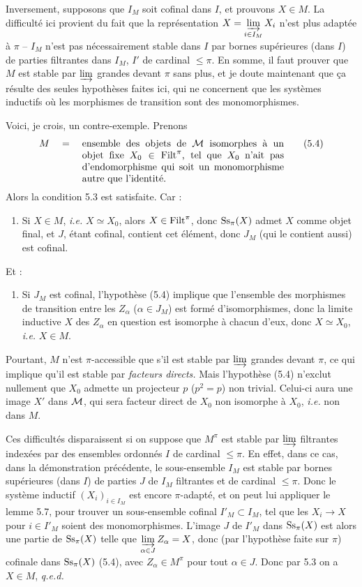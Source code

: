 Inversement, supposons que $I_M$ soit cofinal dans $I$, et prouvons $X \in M$. La difficulté ici provient du fait que la représentation $X = \varinjlim\limits_{i\in I_M} X_i$ n'est plus adaptée à $\pi$ -- $I_M$ n'est pas nécessairement stable dans $I$ par bornes supérieures (dans $I$) de parties filtrantes dans $I_M$, $I'$ de cardinal $\leq \pi$. En somme, il faut
prouver que $M$ est stable par $\varinjlim$ grandes devant $\pi$ sans plus, et je doute maintenant que ça résulte des seules hypothèses faites ici, qui ne concernent que les systèmes inductifs où les morphismes de transition sont des monomorphismes.

Voici, je crois, un contre-exemple. Prenons
\[
M \quad = \quad \parbox[t]{0.6\textwidth}{ensemble des objets de $\cM$ isomorphes à un objet fixe $X_0 \in \Filt^{\pi}$, tel que $X_0$ n'ait pas d'endomorphisme qui soit un monomorphisme autre que l'identité.}
\tag*{(5.4)}
\]
Alors la condition 5.3 est satisfaite. Car :
\begin{enumerate}[nosep]
\item[\textit{a})] Si $X \in M$, \textit{i.e.} $X \simeq X_0$, alors $X \in \mathrm{Filt}^{\pi}$, donc $\mathrm{Ss}_{\pi}(X)$ admet $X$ comme objet final, et $J$, étant cofinal, contient cet élément, donc $J_M$ (qui le contient aussi) est cofinal.
\end{enumerate}
Et :
\begin{enumerate}[nosep]
\item[\textit{b})] Si $J_M$ est cofinal, l'hypothèse (5.4) implique que l'ensemble des morphismes de transition entre les $Z_{\alpha}$ ($\alpha \in J_M$) est formé d'isomorphismes, donc la limite inductive $X$ des $Z_{\alpha}$ en question est isomorphe à chacun d'eux, donc $X \simeq X_0$, \textit{i.e.} $X \in M$.
\end{enumerate}
Pourtant, $M$ n'est $\pi$-accessible que s'il est stable par $\varinjlim$ grandes devant $\pi$, ce qui implique qu'il est stable par \textit{facteurs directs.} Mais l'hypothèse
(5.4) n'exclut nullement que $X_0$ admette un projecteur $p$ ($p^{2} = p$) non trivial. Celui-ci aura une image $X'$ dans $\mathcal{M}$, qui sera facteur direct de $X_0$ non isomorphe à $X_0$, \textit{i.e.} non dans $M$.

Ces difficultés disparaissent si on suppose que $M^{\pi}$ est stable par $\varinjlim$ filtrantes indexées par des ensembles ordonnés $I$ de cardinal $\leq \pi$. En effet, dans ce cas, dans la démonstration précédente, le sous-ensemble $I_M$ est stable par bornes supérieures (dans $I$) de parties $J$ de $I_M$ filtrantes et de cardinal $\leq \pi$. Donc le système inductif $(X_i)_{i\in I_M}$ est encore $\pi$-adapté, et on peut lui appliquer le lemme 5.7, pour trouver un sous-ensemble cofinal $I'_M \subset I_M$, tel que les $X_i \longrightarrow X$ pour $i \in I'_M$ soient des monomorphismes. L'image $J$ de $I'_M$ dans $\mathrm{Ss}_{\pi}(X)$ est alors une partie de $\mathrm{Ss}_{\pi}(X)$ telle que $\varinjlim\limits_{\alpha\in J} Z_{\alpha} = X$, donc (par l'hypothèse faite sur $\pi$) cofinale dans $\mathrm{Ss}_{\pi}(X)$ (5.4), avec $Z_{\alpha} \in M^{\pi}$ pour tout $\alpha \in J$. Donc par 5.3 on a $X \in M$, \textit{q.e.d.}

